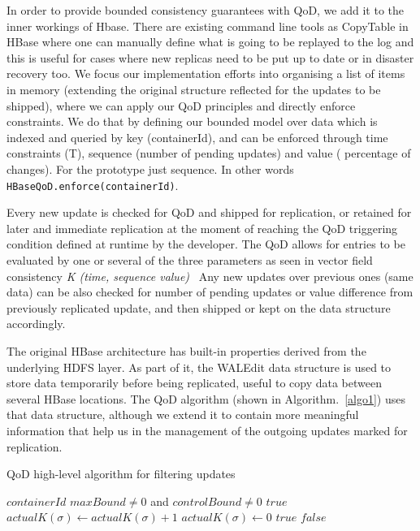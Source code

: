


In order to provide bounded consistency guarantees with QoD, we add it to the inner workings of Hbase. There are existing command line tools as CopyTable in HBase where one can manually define what is going to be replayed to the log and this is useful for cases where new replicas need to be put up to date or in disaster recovery too. We focus our implementation efforts into organising a list of items in memory (extending the original structure reflected for the updates to be shipped), where we can apply our QoD principles and directly enforce constraints. We do that by defining our bounded model over data which is indexed and queried by key (containerId), and can be enforced through time constraints (T), sequence (number of pending updates) and value ( percentage of changes). For the prototype just sequence. In other words \texttt{HBaseQoD.enforce(containerId)}.

Every new update is checked for QoD and shipped for replication, or retained for later and immediate replication at the moment of reaching the QoD triggering condition defined at runtime by the developer. The QoD allows for entries to be evaluated by one or several of the three parameters as seen in vector field consistency \emph{K (time, sequence value)}~\cite{Santos:2007} Any new updates over previous ones (same data) can be also checked for number of pending updates or value difference from previously replicated update, and then shipped or kept on the data structure accordingly.

The original HBase architecture has built-in properties derived from the underlying HDFS layer. As part of it, the WALEdit data structure is used to store data temporarily before being replicated, useful to copy data between several HBase locations. The QoD algorithm (shown in Algorithm.~\ref{algo1}) uses that data structure, although we extend it to contain more meaningful information that help us in the management of the outgoing updates marked for replication.

\begin{algorithm*}
\caption{QoD high-level algorithm for filtering updates}
\label{algo1}
\begin{algorithmic}[1]
\REQUIRE $containerId$
\ENSURE $maxBound \neq 0$ and $controlBound \neq 0$
\RETURN $true$
\STATE $actualK(\sigma) \leftarrow actualK(\sigma)+1$
	\STATE $actualK(\sigma) \leftarrow 0$
	\RETURN $true$
	\ELSE
	\RETURN $false$
	\ENDIF
\ENDIF
\ENDWHILE
\end{algorithmic}
\end{algorithm*}

